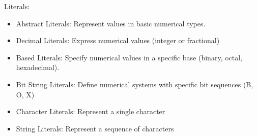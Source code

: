 \documentclass[a4paper,12pt]{article}
\begin{document}
	Literals:
	\begin{itemize}
		\item Abstract Literals: Represent values in basic numerical types.
		\item Decimal Literals: Express numerical values (integer or fractional)
		\item Based Literals: Specify numerical values in a specific base (binary, octal, hexadecimal).
		\item Bit String Literals: Define numerical systems with specific bit sequences (B, O, X)
		\item Character Literals: Represent a single character
		\item String Literals: Represent a sequence of characters
	\end{itemize}
	
	
	
\end{document}
